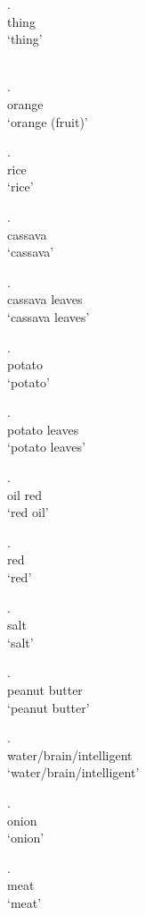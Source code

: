 \documentclass{assets/fieldnotes}
\begin{document}
\exg.  \\
thing \\
`thing'\\
\\

\exg.  \\ 
orange\\
`orange (fruit)'

\exg.  \\ 
rice\\
`rice'

\exg.  \\ 
cassava\\
`cassava'

\exg.  \\ 
cassava leaves\\
`cassava leaves'

\exg.  \\ 
potato\\
`potato'

\exg.  \\ 
potato leaves\\
`potato leaves'

\exg.  \\ 
oil red\\
`red oil'

\exg.  \\ 
red\\
`red'

\exg.  \\ 
salt\\
`salt'

\exg.  \\ 
peanut butter\\
`peanut butter'

\exg.  \\ 
water/brain/intelligent\\
`water/brain/intelligent'

\exg.  \\ 
onion\\
`onion'

\exg.  \\ 
meat\\
`meat'
\end{document}
